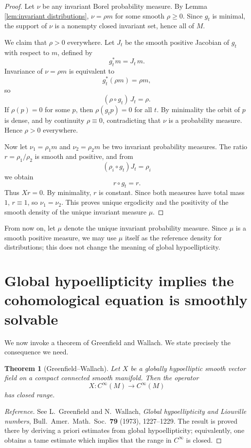 \documentclass[11pt]{article}
\newtheorem{theorem}{Theorem}[section]
\theoremstyle{definition}
\begin{document}
\begin{proof}
Let \(\nu\) be any invariant Borel probability measure. By Lemma \ref{lem:invariant distributions}, \(\nu=\rho m\) for some smooth \(\rho\ge0\). Since \(g_t\) is minimal, the support of \(\nu\) is a nonempty closed invariant set, hence all of \(M\).

We claim that \(\rho>0\) everywhere. Let \(J_t\) be the smooth positive Jacobian of \(g_t\) with respect to \(m\), defined by
\[
g_t^*m=J_t\,m.
\]
Invariance of \(\nu=\rho m\) is equivalent to
\[
g_t^*(\rho m)=\rho m,
\]
so
\[
(\rho\circ g_t)\,J_t=\rho.
\]
If \(\rho(p)=0\) for some \(p\), then \(\rho(g_t p)=0\) for all \(t\). By minimality the orbit of \(p\) is dense, and by continuity \(\rho\equiv0\), contradicting that \(\nu\) is a probability measure. Hence \(\rho>0\) everywhere.

Now let \(\nu_1=\rho_1m\) and \(\nu_2=\rho_2m\) be two invariant probability measures. The ratio \(r=\rho_1/\rho_2\) is smooth and positive, and from
\[
(\rho_i\circ g_t)J_t=\rho_i
\]
we obtain
\[
r\circ g_t=r.
\]
Thus \(Xr=0\). By minimality, \(r\) is constant. Since both measures have total mass \(1\), \(r\equiv1\), so \(\nu_1=\nu_2\). This proves unique ergodicity and the positivity of the smooth density of the unique invariant measure \(\mu\).
\end{proof}

From now on, let \(\mu\) denote the unique invariant probability measure. Since \(\mu\) is a smooth positive measure, we may use \(\mu\) itself as the reference density for distributions; this does not change the meaning of global hypoellipticity.

\section{Global hypoellipticity implies the cohomological equation is smoothly solvable}

We now invoke a theorem of Greenfield and Wallach. We state precisely the consequence we need.

\begin{theorem}[Greenfield--Wallach]\label{thm:GW}
Let \(X\) be a globally hypoelliptic smooth vector field on a compact connected smooth manifold. Then the operator
\[
X:C^\infty(M)\longrightarrow C^\infty(M)
\]
has closed range.
\end{theorem}

\begin{proof}[Reference]
See L.~Greenfield and N.~Wallach, \emph{Global hypoellipticity and Liouville numbers}, Bull.\ Amer.\ Math.\ Soc.\ \textbf{79} (1973), 1227--1229. The result is proved there by deriving a priori estimates from global hypoellipticity; equivalently, one obtains a tame estimate which implies that the range in \(C^\infty\) is closed.
\end{proof}
\end{document}
